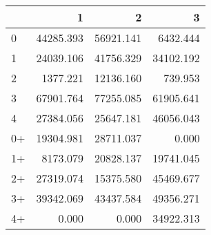 \begin{tabular}{lrrr}
\toprule
     &         1 &         2 &         3 \\
\midrule
 0   & \num{44285.393} & \num{56921.141} &  \num{6432.444} \\
 1   & \num{24039.106} & \num{41756.329} & \num{34102.192} \\
 2   &  \num{1377.221} & \num{12136.160} &   \num{739.953} \\
 3   & \num{67901.764} & \num{77255.085} & \num{61905.641} \\
 4   & \num{27384.056} & \num{25647.181} & \num{46056.043} \\
 0+  & \num{19304.981} & \num{28711.037} &     \num{0.000} \\
 1+  &  \num{8173.079} & \num{20828.137} & \num{19741.045} \\
 2+  & \num{27319.074} & \num{15375.580} & \num{45469.677} \\
 3+  & \num{39342.069} & \num{43437.584} & \num{49356.271} \\
 4+  &     \num{0.000} &     \num{0.000} & \num{34922.313} \\
\bottomrule
\end{tabular}